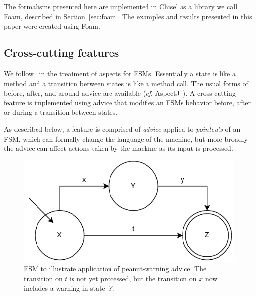 \documentclass[sigplan,anonymous,review]{acmart}
\begin{document}
The formalisms presented here are implemented in Chisel as a library we call Foam, described in Section~\ref{sec:foam}.  The examples and results presented in this paper were created using Foam.  

\subsection{Cross-cutting features}
We follow~\cite{aspectsUML} in the treatment of aspects for FSMs.  Essentially a state is like a method and a transition between states is like a method call.  The usual forms of before, after, and around advice are available (\textit{cf}. AspectJ~\cite{AspectJ:01}).   A cross-cutting feature is implemented using advice that modifies an FSMs behavior before, after or during a transition between states.

As described below, a feature is comprised of \emph{advice} applied to \emph{pointcuts} of an FSM, which can formally change the language of the machine, but more broadly the advice can affect actions taken by the machine as its input is processed.  

\begin{figure}
    \centering
    \includegraphics[width=0.7\linewidth]{figures/ExampleFSM.pdf}
    \caption{FSM to illustrate application of peanut-warning advice.  The transition on $t$ is not yet processed, but the transition on $x$ now includes a warning in state~$Y$.}
    \label{fig:applyadvice}
\end{figure}
\end{document}
